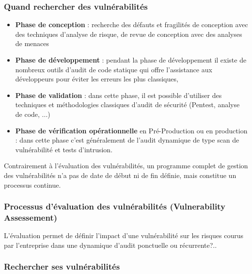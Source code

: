 \begin{frame}
\frametitle<presentation>{Quand rechercher des vulnérabilités}
\begin{itemize}
  \item \textbf{Phase de conception} : recherche des défauts et fragilités de conception avec des techniques d'analyse de risque, de revue de conception avec des analyses de menaces
  \item \textbf{Phase de développement} : pendant la phase de développement il existe de nombreux outils d'audit de code statique qui offre l'assistance aux développeurs pour éviter les erreurs les plus classiques,
  \item \textbf{Phase de validation} : dans cette phase, il est possible d'utiliser des techniques et méthodologies classiques d'audit de sécurité (Pentest, analyse de code, ...)
  \item \textbf{Phase de vérification opérationnelle} en Pré-Production ou en production : dans cette phase c'est généralement de l'audit dynamique de type scan de vulnérabilité et tests d'intrusion.
\end{itemize}
\end{frame}

Contrairement à l’évaluation des vulnérabilités, un programme complet de gestion des vulnérabilités n’a pas de date de début ni de fin définie, mais constitue un processus continue.

\subsubsection{Processus d’évaluation des vulnérabilités (Vulnerability Assessement)}


L'évaluation permet de définir l'impact d'une vulnérabilité sur les risques courus par l'entreprise dans une dynamique d'audit ponctuelle ou récurrente?..






\begin{frame}
\frametitle<presentation>{Rechercher ses vulnérabilités}
\end{frame}



